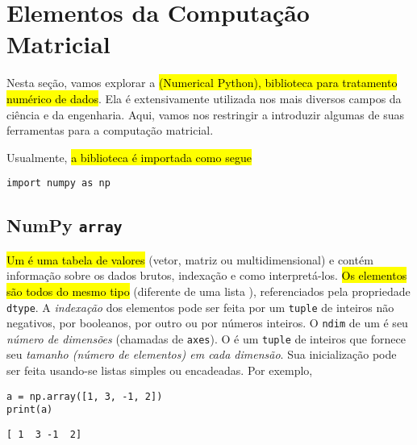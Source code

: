 
\section{Elementos da Computação Matricial}\label{sec_mat}

Nesta seção, vamos explorar a \hl{{\numpy} (Numerical Python), biblioteca para tratamento numérico de dados}. Ela é extensivamente utilizada nos mais diversos campos da ciência e da engenharia. Aqui, vamos nos restringir a introduzir algumas de suas ferramentas para a computação matricial.

Usualmente, \hl{a biblioteca é importada como segue}

\begin{lstlisting}
import numpy as np
\end{lstlisting}

\subsection{NumPy \texttt{array}}

\hl{Um {\PYTHONnumpyDOTarray} é uma tabela de valores} (vetor, matriz ou multidimensional) e contém informação sobre os dados brutos, indexação e como interpretá-los. \hl{Os elementos são todos do mesmo tipo} (diferente de uma lista {\python}), referenciados pela propriedade \texttt{dtype}. A \emph{indexação} dos elementos pode ser feita por um \texttt{tuple} de inteiros não negativos, por booleanos, por outro {\PYTHONnumpyDOTarray} ou por números inteiros. O \texttt{ndim} de um {\PYTHONnumpyDOTarray} é seu \emph{número de dimensões} (chamadas de \texttt{axes}). O {\PYTHONnumpyDOTndarrayDOTshape} é um \texttt{tuple} de inteiros que fornece seu \emph{tamanho (número de elementos) em cada dimensão}. Sua inicialização pode ser feita usando-se listas simples ou encadeadas. Por exemplo,

\begin{lstlisting}
a = np.array([1, 3, -1, 2])
print(a)
\end{lstlisting}

\begin{verbatim}
[ 1  3 -1  2]
\end{verbatim}

